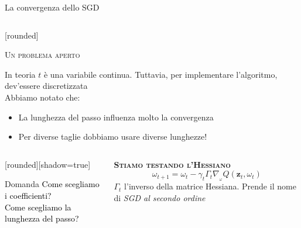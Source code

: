 \documentclass[xcolor=x11names,compress]{beamer}
\renewcommand{\(}{\begin{columns}}
\renewcommand{\)}{\end{columns}}
\newcommand{\<}[1]{\begin{column}{#1}}
\renewcommand{\>}{\end{column}}
\begin{document}
\begin{frame}{La convergenza dello SGD}
\begin{columns}[c]
\hspace{0pt}

\begin{column}{0.35\textwidth}

[rounded]

\vspace{0.2cm}

\begin{block}{\textsc{Un problema aperto}}

\scriptsize{\textcolor{textCWI}{
In teoria $t$ è una variabile continua. Tuttavia, per implementare l'algoritmo, dev'essere discretizzata
\\ \vspace{0.3cm} 
Abbiamo notato che:
}
\begin{itemize}
\item \textcolor{textCWI}{La lunghezza del passo influenza molto la convergenza}
\item \textcolor{textCWI}{Per diverse taglie dobbiamo usare diverse lunghezze!}
\end{itemize}
}
\end{block}
\end{column}

\end{columns}

\begin{columns}[c]

\begin{column}{0.5\textwidth}

[rounded][shadow=true]
\begin{block}{\textcolor{myred}{ \small Domanda}}
\textcolor{black}{ \small
Come scegliamo i coefficienti?
\\
Come scegliamo la lunghezza del passo?   
}
\end{block}

\end{column}

\hspace{-10pt}
\vrule{}

\begin{column}{0.5\textwidth}{\small{\textbf{\textsc{\textcolor{skyblueCWI}{Stiamo testando l'Hessiano}}}}}
\vspace{-0.2cm}
$$\omega_{t+1} = \omega_{t} - \gamma_t \Gamma_t \nabla_{_{\omega}} Q(\textbf{z}_t, \omega_t)$$
\footnotesize{\textcolor{textCWI}{\scriptsize $\Gamma_t$ l'inverso della matrice Hessiana. Prende il nome di \emph{SGD al secondo ordine} }}
\end{column}
\end{columns}

\end{frame}
\end{document}
